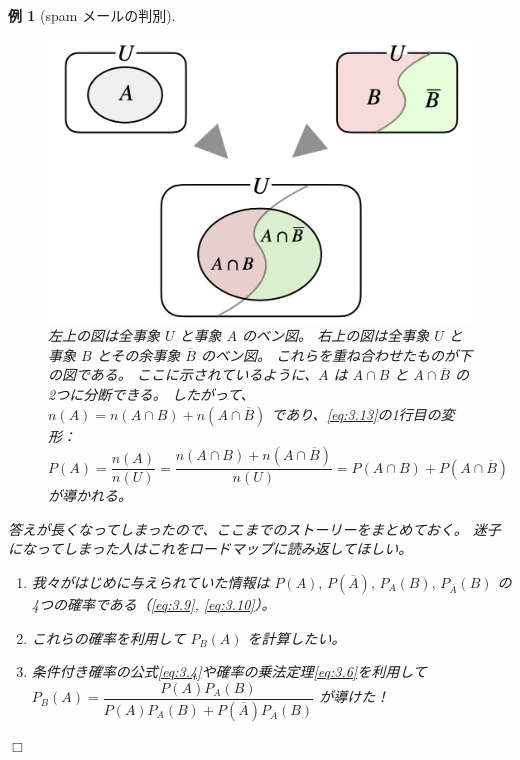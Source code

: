 \documentclass[12pt]{ltjsarticle}\usepackage{ifthen}\newcounter{enlarge}\setcounter{enlarge}{1}
\def\qed{\hfill $\Box$}
\newtheorem{eg}{例}
\begin{document}
\begin{eg}[spam メールの判別]
  \begin{figure}[] 
    \centering 
    \includegraphics[width=10truecm]{./figure/f3-1.png}
    \captionsetup{width=.9\linewidth}
    \caption{%
      左上の図は全事象 $U$ と事象 $A$ のベン図。
      右上の図は全事象 $U$ と事象 $B$ とその余事象 $\overline{B}$ のベン図。
      これらを重ね合わせたものが下の図である。
      ここに示されているように、$A$ は $A \cap B$ と $A \cap \overline{B}$ の2つに分断できる。
      したがって、$n(A) = n(A \cap B) + n(A \cap \overline{B})$ であり、\eqref{eq:3.13}の1行目の変形：$P(A) = \dfrac{n(A)}{n(U)} = \dfrac{n(A \cap B) + n(A \cap \overline{B})}{n(U)} = P(A \cap B) + P(A \cap \overline{B})$ が導かれる。
    }
    \label{f:3.1}
  \end{figure}

  答えが長くなってしまったので、ここまでのストーリーをまとめておく。
  迷子になってしまった人はこれをロードマップに読み返してほしい。
  \begin{enumerate}
  \item 我々がはじめに与えられていた情報は $P(A),\, P(\overline{A}),\, P_A (B),\, P_{\overline{A}} (B)$ の4つの確率である（\eqref{eq:3.9}, \eqref{eq:3.10}）。
  \item これらの確率を利用して $P_B (A)$ を計算したい。
  \item 条件付き確率の公式\eqref{eq:3.4}や確率の乗法定理\eqref{eq:3.6}を利用して $P_B (A) = \dfrac{P(A) P_A (B)}{P(A) P_A (B) + P(\overline{A}) P_{\overline{A}} (B)}$ が導けた！ \bigstar
  \end{enumerate}
\qed\end{eg}
\end{document}
